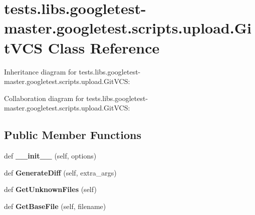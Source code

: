 \hypertarget{classtests_1_1libs_1_1googletest-master_1_1googletest_1_1scripts_1_1upload_1_1GitVCS}{}\section{tests.\+libs.\+googletest-\/master.googletest.\+scripts.\+upload.\+Git\+V\+CS Class Reference}
\label{classtests_1_1libs_1_1googletest-master_1_1googletest_1_1scripts_1_1upload_1_1GitVCS}


Inheritance diagram for tests.\+libs.\+googletest-\/master.googletest.\+scripts.\+upload.\+Git\+V\+CS\+:


Collaboration diagram for tests.\+libs.\+googletest-\/master.googletest.\+scripts.\+upload.\+Git\+V\+CS\+:
\subsection*{Public Member Functions}
\begin{DoxyCompactItemize}
\item 
\mbox{\label{classtests_1_1libs_1_1googletest-master_1_1googletest_1_1scripts_1_1upload_1_1GitVCS_ac1b95fb58063fc65a70f229bd871ba4a}} 
def {\bfseries \+\_\+\+\_\+init\+\_\+\+\_\+} (self, options)
\item 
\mbox{\label{classtests_1_1libs_1_1googletest-master_1_1googletest_1_1scripts_1_1upload_1_1GitVCS_a07785d2710c06e26258a0fcb380f093f}} 
def {\bfseries Generate\+Diff} (self, extra\+\_\+args)
\item 
\mbox{\label{classtests_1_1libs_1_1googletest-master_1_1googletest_1_1scripts_1_1upload_1_1GitVCS_a8c8e4165acded00f95b5bef6c9b2398a}} 
def {\bfseries Get\+Unknown\+Files} (self)
\item 
\mbox{\label{classtests_1_1libs_1_1googletest-master_1_1googletest_1_1scripts_1_1upload_1_1GitVCS_a7d5a73f792e3eb8b647dc1d39f6922f0}} 
def {\bfseries Get\+Base\+File} (self, filename)
\end{DoxyCompactItemize}
